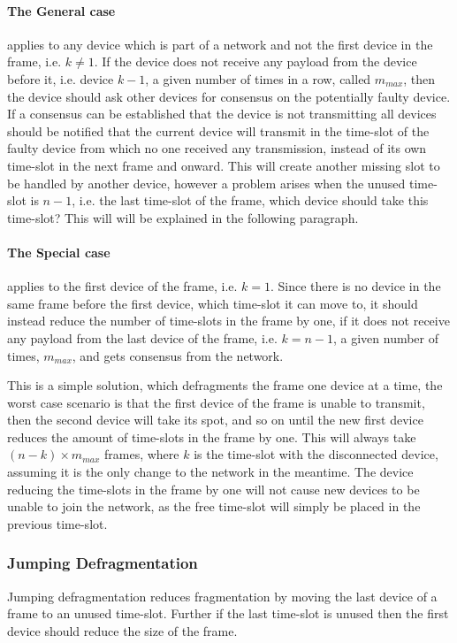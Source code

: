\paragraph{The General case}applies to any device which is part of a network and not the first device in the frame, i.e. $k \neq 1$.
If the device does not receive any payload from the device before it, i.e. device $k - 1$, a given number of times in a row, called $m_{max}$, then the device should ask other devices for consensus on the potentially faulty device.
If a consensus can be established that the device is not transmitting all devices should be notified that the current device will transmit in the time-slot of the faulty device from which no one received any transmission, instead of its own time-slot in the next frame and onward. 
This will create another missing slot to be handled by another device, however a problem arises when the unused time-slot is $n - 1$, i.e. the last time-slot of the frame, which device should take this time-slot?
This will will be explained in the following paragraph.

\paragraph{The Special case}applies to the first device of the frame, i.e. $k = 1$. 
Since there is no device in the same frame before the first device, which time-slot it can move to, it should instead reduce the number of time-slots in the frame by one, if it does not receive any payload from the last device of the frame, i.e. $k = n - 1$, a given number of times, $m_{max}$, and gets consensus from the network. 


\bigskip \noindent
This is a simple solution, which defragments the frame one device at a time, the worst case scenario is that the first device of the frame is unable to transmit, then the second device will take its spot, and so on until the new first device reduces the amount of time-slots in the frame by one. 
This will always take $(n - k) \times m_{max}$ frames, where $k$ is the time-slot with the disconnected device, assuming it is the only change to the network in the meantime. 
The device reducing the time-slots in the frame by one will not cause new devices to be unable to join the network, as the free time-slot will simply be placed in the previous time-slot. 

\subsubsection{Jumping Defragmentation}
Jumping defragmentation reduces fragmentation by moving the last device of a frame to an unused time-slot. Further if the last time-slot is unused then the first device should reduce the size of the frame.

